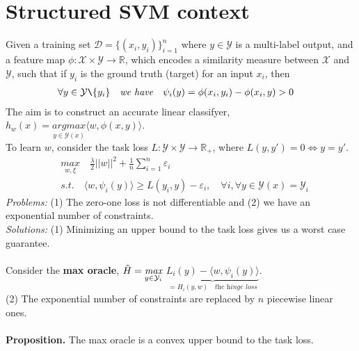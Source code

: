 \documentclass{article}
\begin{document}
\section{Structured SVM context}
Given a training set $\mathcal{D}=\{(x_i,y_i)\}_{i=1}^n$ where $y \in \mathcal{Y}$ is a multi-label output, and a feature map $\phi:\mathcal{X}\times\mathcal{Y}\longrightarrow \mathbb{R}$, which encodes a similarity measure between $\mathcal{X}$ and $\mathcal{Y}$, such that if $y_{i}$ is the ground truth (target) for an input $x_{i}$, then
\begin{equation*}
\begin{aligned}
    &\forall y\in\mathcal{Y}\texttt{\symbol{92}}\{y_{i}\}\quad\textit{we have}\quad \psi_{i}(y) = \phi(x_{i},y_{i})- \phi(x_{i},y) > 0
\end{aligned}
\end{equation*}
The aim is to construct an accurate linear classifyer, $h_{w}(x)= \underset{y\in\mathcal{Y}(x)}{\textit{argmax}}\langle w, \phi(x,y)\rangle$.\\
To learn $w$, consider the task loss $L:\mathcal{Y}\times\mathcal{Y}\longrightarrow\mathbb{R}_{+}$, where $L(y,y\prime)= 0 \Longleftrightarrow y= y\prime$.
\begin{equation*}
\begin{aligned}
    &\underset{w,\xi}{\textit{max}}\quad\frac{\lambda}{2}||w||^{2}+ \frac{1}{n}\sum_{i=1}^{n}\varepsilon_{i}\\
    &\textit{s.t.}\quad \langle w, \psi_{i}(y)\rangle \geq L(y_{i},y)- \varepsilon_{i},\quad\forall i ,\forall y\in\mathcal{Y}(x)=\mathcal{Y}_{i}
\end{aligned}
\end{equation*}
\textit{Problems:} (1) The zero-one loss is not differentiable and (2) we have an exponential number of constraints.\\
\textit{Solutions:} (1) Minimizing an upper bound to the task loss gives us a worst case guarantee.
\\
\\
Consider the \textbf{max oracle}, $\Tilde{H}= \underset{y\in\mathcal{Y}_{i}}{\textit{max}}$ $\underbrace{L_{i}(y)- \langle w, \psi_{i}(y)\rangle}_{= H_{i}(y,w)\quad\textit{the hinge loss}}$.\\
(2) The exponential number of constraints are replaced by $n$ piecewise linear ones.
\\
\\
\textbf{Proposition.} The max oracle is a convex upper bound to the task loss.\\
\end{document}
